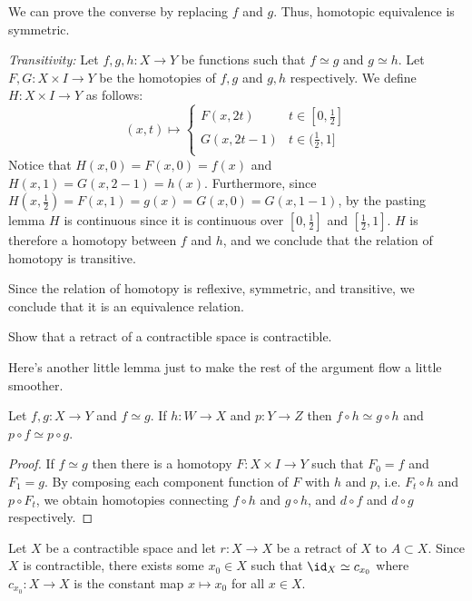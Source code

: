 \begin{homework}[e]
\begin{prf}
\begin{enumerate}[(a)]
			We can prove the converse by replacing $f$ and $g$. Thus, homotopic equivalence is symmetric. 
			
			\bigskip
			
			\emph{Transitivity:} Let $f,g,h: X \rightarrow Y$ be functions such that $f \simeq g$ and $g \simeq h$. Let $F,G: X \times I \rightarrow Y$ be the homotopies of $f,g$ and $g, h$ respectively. We define $H: X \times I \rightarrow Y$ as follows:
			\begin{equation*}
			(x,t) \mapsto
			 \begin{cases}
				F(x,2t) & t \in [0, \frac{1}{2}] \\
				G(x,2t - 1) & t \in (\frac{1}{2}, 1] \\
			 \end{cases}
			\end{equation*}
			Notice that $H(x,0) = F(x,0) = f(x)$ and $H(x,1) = G(x,2-1) = h(x)$. Furthermore, since $H(x,\frac{1}{2}) = F(x,1) = g(x) = G(x,0) = G(x,1 - 1)$, by the pasting lemma $H$ is continuous since it is continuous over $[0,\frac{1}{2}]$ and $[\frac{1}{2},1]$. $H$ is therefore a homotopy between $f$ and $h$, and we conclude that the relation of homotopy is transitive.
			
			\bigskip
			
			Since the relation of homotopy is reflexive, symmetric, and transitive, we conclude that it is an equivalence relation.
		\end{enumerate}
	\end{prf}

	\newpage
	 Show that a retract of a contractible space is contractible.

	\begin{prf}
		Here's another little lemma just to make the rest of the argument flow a little smoother.
		\begin{lem}
			Let $f,g: X \rightarrow Y$ and $f \simeq g$. If $h: W \rightarrow X$ and $p: Y \rightarrow Z$ then $f \circ h \simeq g \circ h$ and $p \circ f \simeq p \circ g$.
		\end{lem}
		\begin{proof}
		  If $f \simeq g$ then there is a homotopy $F: X\times I \rightarrow Y$ such that $F_0 = f$ and $F_1 = g$. By composing each component function of $F$ with $h$ and $p$, i.e. $F_t \circ h$ and $p \circ F_t$, we obtain homotopies connecting $f \circ h$ and $g \circ h$, and $d \circ f$ and $d \circ g$ respectively.
		\end{proof}
		Let $X$ be a contractible space and let $r:X \rightarrow X$ be a retract of $X$ to $A \subset X$. Since $X$ is contractible, there exists some $x_0 \in X$ such that $\id_X \simeq c_{x_0}$ where $c_{x_0}: X \rightarrow X$ is the constant map $x \mapsto x_0$ for all $x \in X$. 


\end{prf}
\end{homework}
